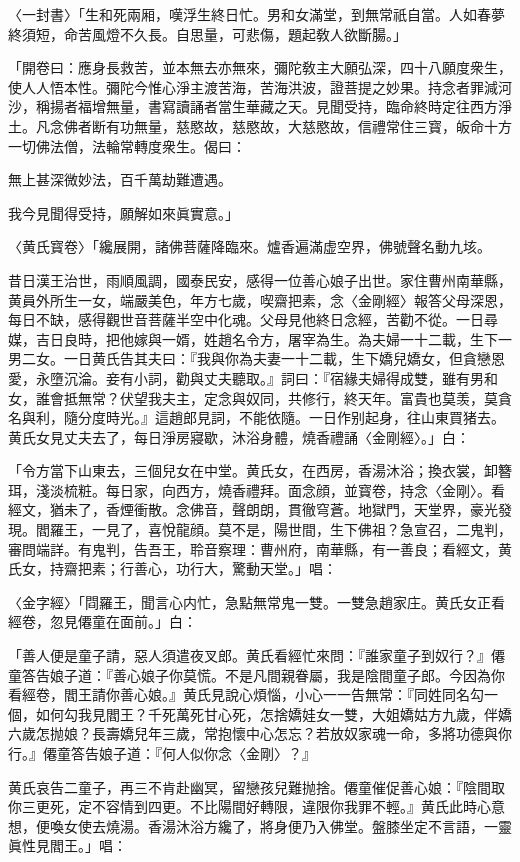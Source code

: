 〈一封書〉「生和死兩厢，嘆浮生終日忙。男和女滿堂，到無常祇自當。人如春夢終須短，命苦風燈不久長。自思量，可悲傷，題起敎人欲斷腸。」

「開卷曰：應身長救苦，並本無去亦無來，彌陀敎主大願弘深，四十八願度衆生，使人人悟本性。彌陀今惟心淨主渡苦海，苦海洪波，證菩提之妙果。持念者罪減河沙，稱揚者福增無量，書寫讀誦者當生華藏之天。見聞受持，臨命終時定往西方淨土。凡念佛者断有功無量，慈愍故，慈愍故，大慈愍故，信禮常住三寳，皈命十方一切佛法僧，法輪常轉度衆生。偈曰：

無上甚深微妙法，百千萬劫難遭遇。

我今見聞得受持，願解如來眞實意。」

〈黄氏寳卷〉「纔展開，諸佛菩薩降臨來。爐香遍滿虚空界，佛號聲名動九垓。

昔日漢王治世，雨順風調，國泰民安，感得一位善心娘子出世。家住曹州南華縣，黄員外所生一女，端嚴美色，年方七歲，喫齋把素，念〈金剛經〉報答父母深恩，每日不缺，感得觀世音菩薩半空中化魂。父母見他終日念經，苦勸不從。一日尋媒，吉日良時，把他嫁與一婿，姓趙名令方，屠宰為生。為夫婦一十二載，生下一男二女。一日黄氏告其夫曰：『我與你為夫妻一十二載，生下嬌兒嬌女，但貪戀恩愛，永墮沉淪。妾有小詞，勸與丈夫聽取。』詞曰：『宿緣夫婦得成雙，雖有男和女，誰會抵無常？伏望我夫主，定念與奴同，共修行，終天年。富貴也莫羡，莫貪名與利，隨分度時光。』這趙郎見詞，不能依隨。一日作别起身，往山東買猪去。黄氏女見丈夫去了，每日淨房寢歇，沐浴身體，燒香禮誦〈金剛經〉。」白：

「令方當下山東去，三個兒女在中堂。黄氏女，在西房，香湯沐浴；換衣裳，卸簪珥，淺淡梳粧。每日家，向西方，燒香禮拜。面念顔，並寳卷，持念〈金剛〉。看經文，猶未了，香煙衝散。念佛音，聲朗朗，貫徹穹蒼。地獄門，天堂界，豪光發現。閻羅王，一見了，喜悅龍顔。莫不是，陽世間，生下佛祖？急宣召，二鬼判，審問端詳。有鬼判，告吾王，聆音察理：曹州府，南華縣，有一善良；看經文，黄氏女，持齋把素；行善心，功行大，驚動天堂。」唱：

〈金字經〉「閰羅王，聞言心内忙，急點無常鬼一雙。一雙急趙家庄。黄氏女正看經卷，忽見僊童在面前。」白：

「善人便是童子請，惡人須遣夜叉郎。黄氏看經忙來問：『誰家童子到奴行？』僊童答告娘子道：『善心娘子你莫慌。不是凡間親眷屬，我是陰間童子郎。今因為你看經卷，閻王請你善心娘。』黄氏見說心煩惱，小心一一告無常：『同姓同名勾一個，如何勾我見閻王？千死萬死甘心死，怎捨嬌娃女一雙，大姐嬌姑方九歲，伴嬌六歲怎抛娘？長壽嬌兒年三歲，常抱懷中心怎忘？若放奴家魂一命，多將功德與你行。』僊童答告娘子道：『何人似你念〈金剛〉？』

黄氏哀告二童子，再三不肯赴幽冥，留戀孩兒難抛捨。僊童催促善心娘：『陰間取你三更死，定不容情到四更。不比陽間好轉限，違限你我罪不輕。』黄氏此時心意想，便喚女使去燒湯。香湯沐浴方纔了，將身便乃入佛堂。盤膝坐定不言語，一靈眞性見閻王。」唱：

